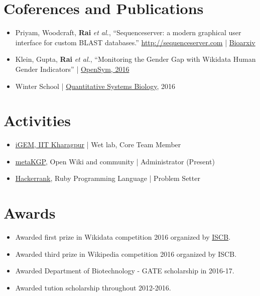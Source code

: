 \documentclass[letter]{res}
\begin{document}
\begin{resume}
\section{Coferences and Publications}
\begin{itemize}
  \item Priyam, Woodcraft, {\bf Rai} \textit{et al.}, ``Sequenceserver: a modern graphical user interface for custom BLAST databases.'' \url{http://sequenceserver.com} | \href{http://www.biorxiv.org/content/early/2015/11/27/033142}{Bioarxiv}
  \item Klein, Gupta, {\bf Rai} \textit{et al.}, ``Monitoring the Gender Gap with Wikidata Human Gender Indicators'' | \href{http://whgi.wmflabs.org/monitoring-gender-gap.pdf}{OpenSym, 2016}
  \item Winter School | \href{https://www.icts.res.in/program/current/details/361/}{Quantitative Systems Biology}, 2016
\end{itemize}
\vspace{-2mm}

\section{Activities} 
\begin{itemize}
\item \href{http://2015.igem.org/Team:IIT_Kharagpur}{iGEM, IIT Kharagpur} | Wet lab, Core Team Member
\item \href{http://wiki.metakgp.org}{metaKGP}, Open Wiki and community  | Administrator (Present)
\item \href{https://www.hackerrank.com}{Hackerrank}, Ruby Programming Language | Problem Setter
 \end{itemize}
\vspace{-2mm}
 
\section{Awards} 
\begin{itemize}
  \item Awarded first prize in Wikidata competition 2016 organized by \href{http://iscb.org/}{ISCB}.
  \item Awarded third prize in Wikipedia competition 2016 organized by ISCB.
  \item Awarded Department of Biotechnology - GATE scholarship in 2016-17.
  \item Awarded tution scholarship throughout 2012-2016.
\end{itemize}
\vspace{-2mm}

\end{resume}
\end{document}
